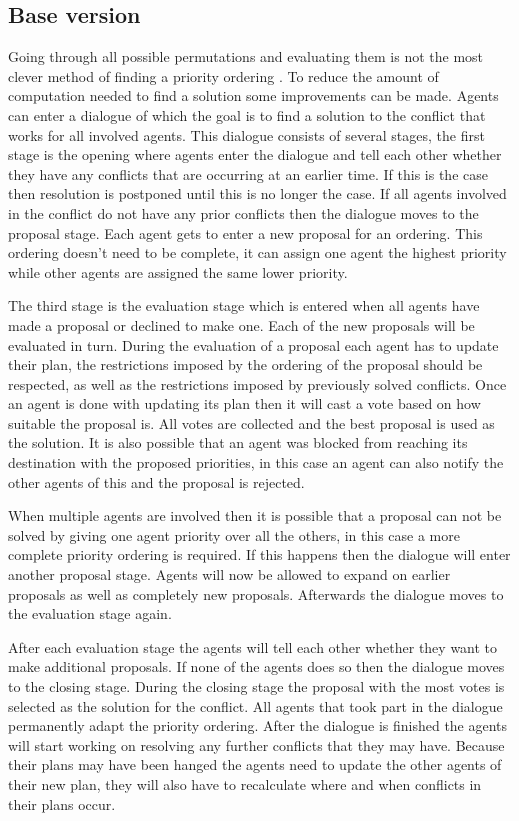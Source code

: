 \subsection{Base version}
Going through all possible permutations and evaluating them is not the most
clever method of finding a priority ordering \cite{bennewitz2002}. To reduce
the amount of computation needed to find a solution some improvements can be
made. Agents can enter a dialogue of which the goal is to find a solution to
the conflict that works for all involved agents. This dialogue consists of
several stages, the first stage is the opening where agents enter the dialogue
and tell each other whether they have any conflicts that are occurring at an
earlier time. If this is the case then resolution is postponed until this is
no longer the case. If all agents involved in the conflict do not have any
prior conflicts then the dialogue moves to the proposal stage. Each agent
gets to enter a new proposal for an ordering. This ordering doesn't need to be
complete, it can assign one agent the highest priority while other agents are
assigned the same lower priority.

The third stage is the evaluation stage which is entered when all agents have
made a proposal or declined to make one. Each of the new proposals will be
evaluated in turn. During the evaluation of a proposal each agent has to update
their plan, the restrictions imposed by the ordering of the proposal should be
respected, as well as the restrictions imposed by previously solved conflicts.
Once an
agent is done with updating its plan then it will cast a vote based on how
suitable the proposal is. All votes are collected and the best proposal is
used as the solution. It is also possible that an agent was blocked from
reaching its destination with the proposed priorities, in this case an agent
can also notify the other agents of this and the proposal is rejected.

When multiple agents are involved then it is possible that a proposal can not
be solved by giving one agent priority over all the others, in this case a more
complete priority ordering is required. If this happens then the dialogue will
enter another proposal stage. Agents will now be allowed to expand on earlier
proposals as well as completely new proposals. Afterwards the dialogue moves to
the evaluation stage again.

After each evaluation stage the agents will tell each other whether they want
to make additional proposals. If none of the agents does so then the dialogue
moves to the closing stage. During the closing stage the proposal with the most
votes is selected as the solution for the conflict. All agents that took part
in the dialogue permanently adapt the priority ordering. After the dialogue is
finished the agents will start working on resolving any further conflicts that
they may have. Because their plans may have been hanged the agents need to
update the other agents of their new plan, they will also have to recalculate
where and when conflicts in their plans occur.


